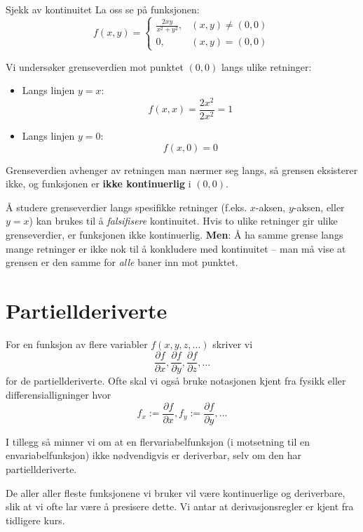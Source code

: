 \begin{eks}{Sjekk av kontinuitet}{}
La oss se på funksjonen:
\[
f(x, y) = 
\begin{cases}
\frac{2xy}{x^2 + y^2}, & (x, y) \neq (0, 0) \\
0, & (x, y) = (0, 0)
\end{cases}
\]

Vi undersøker grenseverdien mot punktet \( (0, 0) \) langs ulike retninger:

\begin{itemize}
    \item Langs linjen \( y = x \):
    \[
    f(x, x) = \frac{2x^2}{2x^2} = 1
    \]
    \item Langs linjen \( y = 0 \):
    \[
    f(x, 0) = 0
    \]
\end{itemize}

Grenseverdien avhenger av retningen man nærmer seg langs, så grensen eksisterer ikke, og funksjonen er \textbf{ikke kontinuerlig} i \( (0, 0) \).
\end{eks}

\begin{rem}{}{}
Å studere grenseverdier langs spesifikke retninger (f.eks. \( x \)-aksen, \( y \)-aksen, eller \( y = x \)) kan brukes til å \emph{falsifisere} kontinuitet. Hvis to ulike retninger gir ulike grenseverdier, er funksjonen ikke kontinuerlig.
\textbf{Men}: Å ha samme grense langs mange retninger er ikke nok til å konkludere med kontinuitet – man må vise at grensen er den samme for \emph{alle} baner inn mot punktet.
\end{rem}

\section{Partiellderiverte}
For en funksjon av flere variabler $f(x,y,z,\ldots)$ skriver vi 
\[\frac{\partial f}{\partial x} , \frac{\partial f}{\partial y} , \frac{\partial f}{\partial z} , \ldots\]
for de partiellderiverte. Ofte skal vi også bruke notasjonen kjent fra fysikk eller differensialligninger hvor \[f_x := \frac{\partial f}{\partial x} , f_y := \frac{\partial f}{\partial y}, \ldots\]

I tillegg så minner vi om at en flervariabelfunksjon (i motsetning til en envariabelfunksjon) ikke nødvendigvis er deriverbar, selv om 
den har partiellderiverte.  

De aller aller fleste funksjonene vi bruker vil være kontinuerlige og deriverbare, slik at
vi ofte lar være å presisere dette. Vi antar at derivasjonsregler er kjent fra tidligere kurs.

